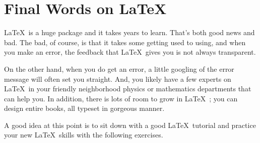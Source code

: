 \section{Final Words on \LaTeX\ }
\LaTeX\ is a huge package and it takes years to learn. That's both good news and bad. The bad, of course, is that it takes some getting used to using, and when you make an error, the feedback that \LaTeX\ gives you is not always transparent. 

On the other hand, when you do get an error, a little googling of the error message will often set you straight. And, you likely have a few experts on \LaTeX\ in your friendly neighborhood physics or mathematics departments that can help you. In addition, there is lots of room to grow in \LaTeX\ ; you can design entire books, all typeset in gorgeous manner. 

A good idea at this point is to sit down with a good \LaTeX\ tutorial and practice your new \LaTeX\ skills with the following exercises.

